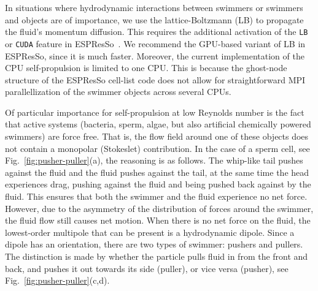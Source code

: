 \documentclass[aip,jcp,reprint,a4paper,onecolumn,amsmath]{revtex4-1}
\newcommand\code{\lstinline}
\newcommand{\es}{\mbox{\textsf{ESPResSo}}\xspace}
\begin{document}
In situations where hydrodynamic interactions between swimmers or swimmers and
objects are of importance, we use the lattice-Boltzmann (LB) to propagate the
fluid's momentum diffusion. This requires the additional activation of the
\code{LB} or \code{CUDA} feature in \es{}~\cite{UG,Arnold_13,roehm12}. We
recommend the GPU-based variant of LB in \es{}, since it is much faster.
Moreover, the current implementation of the CPU self-propulsion is limited to
one CPU. This is because the ghost-node structure of the \es{} cell-list code
does not allow for straightforward MPI parallellization of the swimmer objects
across several CPUs.

Of particular importance for self-propulsion at low Reynolds number is the fact
that active systems (bacteria, sperm, algae, but also artificial chemically
powered swimmers) are force free. That is, the flow field around one of these
objects does not contain a monopolar (Stokeslet) contribution. In the case of a
sperm cell, see Fig.~\ref{fig:pusher-puller}(a), the reasoning is as follows.
The whip-like tail pushes against the fluid and the fluid pushes against the
tail, at the same time the head experiences drag, pushing against the fluid and
being pushed back against by the fluid. This ensures that both the swimmer and
the fluid experience no net force. However, due to the asymmetry of the
distribution of forces around the swimmer, the fluid flow still causes net
motion. When there is no net force on the fluid, the lowest-order multipole
that can be present is a hydrodynamic dipole. Since a dipole has an
orientation, there are two types of swimmer: pushers and pullers. The
distinction is made by whether the particle pulls fluid in from the front and
back, and pushes it out towards its side (puller), or vice versa (pusher), see
Fig.~\ref{fig:pusher-puller}(c,d).
\end{document}
